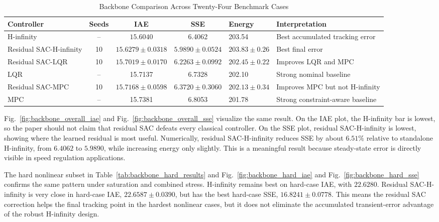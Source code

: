 \documentclass[conference]{IEEEtran}
\begin{document}
\begin{table}[!tbp]
\caption{Backbone Comparison Across Twenty-Four Benchmark Cases}
\label{tab:backbone_results}
\centering
\scriptsize
\begin{tabular}{lccclp{}}
\hline
Controller & Seeds & IAE & SSE & Energy & Interpretation \\
\hline
H-infinity & -- & $\mathbf{15.6040}$ & 6.4062 & 203.54 & Best accumulated tracking error \\
Residual SAC-H-infinity & 10 & $15.6279 \pm 0.0318$ & $\mathbf{5.9890 \pm 0.0524}$ & $203.83 \pm 0.26$ & Best final error \\
Residual SAC-LQR & 10 & $15.7019 \pm 0.0170$ & $6.2263 \pm 0.0992$ & $202.45 \pm 0.22$ & Improves LQR and MPC \\
LQR & -- & 15.7137 & 6.7328 & 202.10 & Strong nominal baseline \\
Residual SAC-MPC & 10 & $15.7168 \pm 0.0598$ & $6.3720 \pm 0.3060$ & $202.13 \pm 0.34$ & Improves MPC but not H-infinity \\
MPC & -- & 15.7381 & 6.8053 & 201.78 & Strong constraint-aware baseline \\
\hline
\end{tabular}
\end{table}
Fig.~\ref{fig:backbone_overall_iae} and Fig.~\ref{fig:backbone_overall_sse} visualize the same result. On the IAE plot, the H-infinity bar is lowest, so the paper should not claim that residual SAC defeats every classical controller. On the SSE plot, residual SAC-H-infinity is lowest, showing where the learned residual is most useful. Numerically, residual SAC-H-infinity reduces SSE by about $6.51\%$ relative to standalone H-infinity, from $6.4062$ to $5.9890$, while increasing energy only slightly. This is a meaningful result because steady-state error is directly visible in speed regulation applications.

The hard nonlinear subset in Table~\ref{tab:backbone_hard_results} and Fig.~\ref{fig:backbone_hard_iae} and Fig.~\ref{fig:backbone_hard_sse} confirms the same pattern under saturation and combined stress. H-infinity remains best on hard-case IAE, with $22.6280$. Residual SAC-H-infinity is very close in hard-case IAE, $22.6587 \pm 0.0390$, but has the best hard-case SSE, $16.8241 \pm 0.0778$. This means the residual SAC correction helps the final tracking point in the hardest nonlinear cases, but it does not eliminate the accumulated transient-error advantage of the robust H-infinity design.
\end{document}
